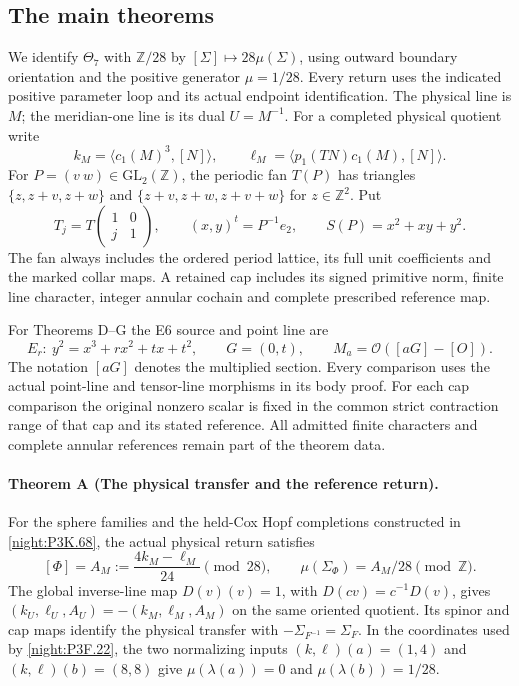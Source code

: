 \subsection{The main theorems}
\label{series:IV:main-theorems}
We identify $\Theta_7$ with $\mathbb Z/28$ by
$[\Sigma]\mapsto28\mu(\Sigma)$, using outward boundary orientation
and the positive generator $\mu=1/28$. Every return uses the indicated
positive parameter loop and its actual endpoint identification.
The physical line is $M$; the meridian-one line is its dual $U=M^{-1}$.
For a completed physical quotient write
\[
 k_M=\langle c_1(M)^3,[N]\rangle,\qquad
 \ell_M=\langle p_1(TN)c_1(M),[N]\rangle.
\]
For $P=(v\ w)\in\mathrm{GL}_2(\mathbb Z)$, the periodic fan $T(P)$
has triangles $\{z,z+v,z+w\}$ and $\{z+v,z+w,z+v+w\}$ for
$z\in\mathbb Z^2$. Put
\[
 T_j=T\!\begin{pmatrix}1&0\\j&1\end{pmatrix},\qquad
 (x,y)^t=P^{-1}e_2,\qquad S(P)=x^2+xy+y^2.
\]
The fan always includes the ordered period lattice, its full unit
coefficients and the marked collar maps. A retained cap includes its
signed primitive norm, finite line character, integer annular cochain
and complete prescribed reference map.

For Theorems D--G the E6 source and point line are
\[
 E_r:\ y^2=x^3+rx^2+tx+t^2,\qquad G=(0,t),\qquad
 M_a=\mathcal O([aG]-[O]).
\]
The notation $[aG]$ denotes the multiplied section. Every comparison
uses the actual point-line and tensor-line morphisms in its body proof.
For each cap comparison the original nonzero scalar is fixed in the
common strict contraction range of that cap and its stated reference.
All admitted finite characters and complete annular references remain
part of the theorem data.

\hypertarget{main-IV-A}{}
\paragraph{Theorem A (The physical transfer and the reference return).}
\label{series:IV:A}
For the sphere families and the held-Cox Hopf completions constructed
in \cref{night:P3K.68}, the actual physical return satisfies
\[
 [\Phi]=A_M:=\frac{4k_M-\ell_M}{24}\pmod{28},\qquad
 \mu(\Sigma_\Phi)=A_M/28\pmod{\mathbb Z}.
\]
The global inverse-line map $D(v)(v)=1$, with
$D(cv)=c^{-1}D(v)$, gives
$(k_U,\ell_U,A_U)=-(k_M,\ell_M,A_M)$ on the same oriented quotient.
Its spinor and cap maps identify the physical transfer with
$-\Sigma_{F^{-1}}=\Sigma_F$. In the coordinates used by
\cref{night:P3F.22}, the two normalizing inputs
$(k,\ell)(a)=(1,4)$ and $(k,\ell)(b)=(8,8)$ give
$\mu(\lambda(a))=0$ and $\mu(\lambda(b))=1/28$.

